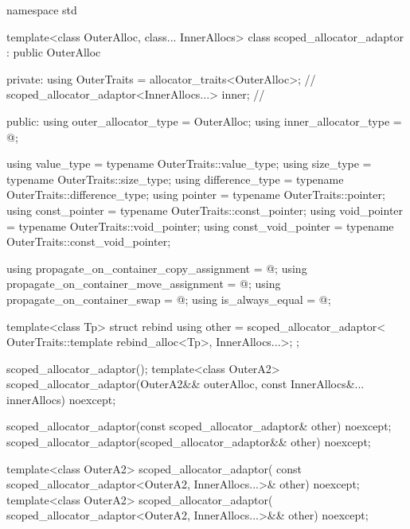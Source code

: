 %
%
%
%
%
%
%
%
%
\begin{codeblock}
namespace std {
  template<class OuterAlloc, class... InnerAllocs>
    class scoped_allocator_adaptor : public OuterAlloc {
  private:
    using OuterTraits = allocator_traits<OuterAlloc>;   // \expos
    scoped_allocator_adaptor<InnerAllocs...> inner;     // \expos

  public:
    using outer_allocator_type = OuterAlloc;
    using inner_allocator_type = @\seebelow@;

    using value_type           = typename OuterTraits::value_type;
    using size_type            = typename OuterTraits::size_type;
    using difference_type      = typename OuterTraits::difference_type;
    using pointer              = typename OuterTraits::pointer;
    using const_pointer        = typename OuterTraits::const_pointer;
    using void_pointer         = typename OuterTraits::void_pointer;
    using const_void_pointer   = typename OuterTraits::const_void_pointer;

    using propagate_on_container_copy_assignment = @\seebelow@;
    using propagate_on_container_move_assignment = @\seebelow@;
    using propagate_on_container_swap            = @\seebelow@;
    using is_always_equal                        = @\seebelow@;

    template<class Tp>
      struct rebind {
        using other = scoped_allocator_adaptor<
          OuterTraits::template rebind_alloc<Tp>, InnerAllocs...>;
      };

    scoped_allocator_adaptor();
    template<class OuterA2>
      scoped_allocator_adaptor(OuterA2&& outerAlloc,
                               const InnerAllocs&... innerAllocs) noexcept;

    scoped_allocator_adaptor(const scoped_allocator_adaptor& other) noexcept;
    scoped_allocator_adaptor(scoped_allocator_adaptor&& other) noexcept;

    template<class OuterA2>
      scoped_allocator_adaptor(
        const scoped_allocator_adaptor<OuterA2, InnerAllocs...>& other) noexcept;
    template<class OuterA2>
      scoped_allocator_adaptor(
        scoped_allocator_adaptor<OuterA2, InnerAllocs...>&& other) noexcept;

}}
\end{codeblock}

